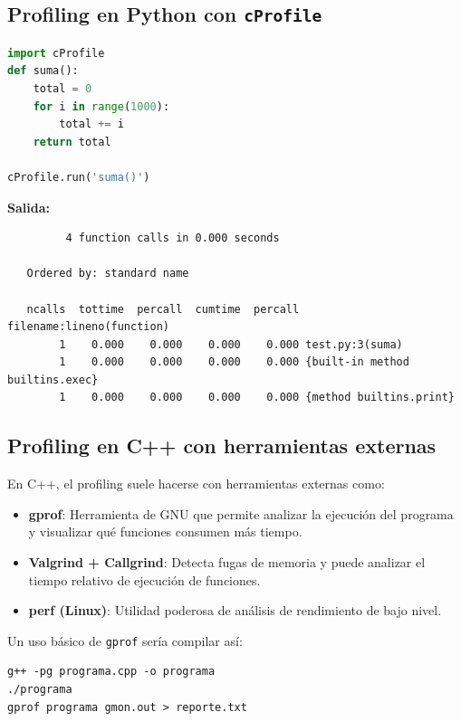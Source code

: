 \documentclass[12pt]{article}
\begin{document}
\subsection{Profiling en Python con \texttt{cProfile}}

\begin{lstlisting}[language = Python]
import cProfile
def suma():
    total = 0
    for i in range(1000):
        total += i
    return total

cProfile.run('suma()')
\end{lstlisting}

\textbf{Salida:}
\begin{lstlisting}
         4 function calls in 0.000 seconds

   Ordered by: standard name

   ncalls  tottime  percall  cumtime  percall filename:lineno(function)
        1    0.000    0.000    0.000    0.000 test.py:3(suma)
        1    0.000    0.000    0.000    0.000 {built-in method builtins.exec}
        1    0.000    0.000    0.000    0.000 {method builtins.print}
\end{lstlisting}

\subsection*{Profiling en C++ con herramientas externas}

En C++, el profiling suele hacerse con herramientas externas como:

\begin{itemize}
    \item \textbf{gprof}: Herramienta de GNU que permite analizar la ejecución del programa y visualizar qué funciones consumen más tiempo.
    \item \textbf{Valgrind + Callgrind}: Detecta fugas de memoria y puede analizar el tiempo relativo de ejecución de funciones.
    \item \textbf{perf (Linux)}: Utilidad poderosa de análisis de rendimiento de bajo nivel.
\end{itemize}

Un uso básico de \texttt{gprof} sería compilar así:

\begin{lstlisting}
g++ -pg programa.cpp -o programa
./programa
gprof programa gmon.out > reporte.txt
\end{lstlisting}
\end{document}
